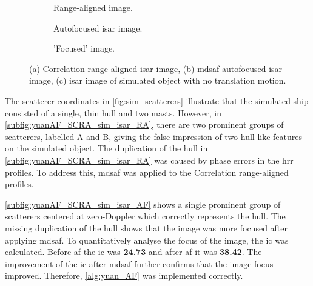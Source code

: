 \documentclass[class=report,11pt,crop=false]{standalone}
\begin{document}
    \begin{figure}[H]
        \centering
        \begin{subfigure}{0.3\linewidth}
            \resizebox{\linewidth}{!}{}
            \caption{Range-aligned image. \label{subfig:yuanAF_SCRA_sim_isar_RA}}
        \end{subfigure}
        \hspace{0.5cm}
        \begin{subfigure}{0.3\linewidth}
            \resizebox{\linewidth}{!}{}
            \caption{Autofocused \gls{isar} image. \label{subfig:yuanAF_SCRA_sim_isar_AF}}
        \end{subfigure}
        \hspace{0.5cm}
        \begin{subfigure}{0.3\linewidth}
            \resizebox{\linewidth}{!}{}
            \caption{'Focused' image.\label{subfig:yuanAF_sim_isar_0mps}}
        \end{subfigure}
        \caption{(a) Correlation range-aligned \gls{isar} image, (b) \gls{mdsaf} autofocused \gls{isar} image, (c) \gls{isar} image of simulated object with no translation motion. \label{fig:hayAF_sim}}
    \end{figure}

    The scatterer coordinates in \autoref{fig:sim_scatterers} illustrate that the simulated ship consisted of a single, thin hull and two masts. However, in \autoref{subfig:yuanAF_SCRA_sim_isar_RA}, there are two prominent groups of scatterers, labelled A and B, giving the false impression of two hull-like features on the simulated object. The duplication of the hull in \autoref{subfig:yuanAF_SCRA_sim_isar_RA} was caused by phase errors in the \gls{hrr} profiles. To address this, \gls{mdsaf} was applied to the Correlation range-aligned profiles. 
    
    \autoref{subfig:yuanAF_SCRA_sim_isar_AF} shows a single prominent group of scatterers centered at zero-Doppler which correctly represents the hull. The missing duplication of the hull shows that the image was more focused after applying \gls{mdsaf}. To quantitatively analyse the focus of the image, the \gls{ic} was calculated. Before \gls{af} the \gls{ic} was \textbf{24.73} and after \gls{af} it was \textbf{38.42}. The improvement of the \gls{ic} after \gls{mdsaf} further confirms that the image focus improved. Therefore, \autoref{alg:yuan_AF} was implemented correctly.
\end{document}
